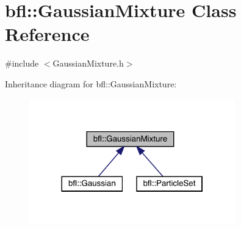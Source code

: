 \hypertarget{classbfl_1_1GaussianMixture}{}\section{bfl\+:\+:Gaussian\+Mixture Class Reference}
\label{classbfl_1_1GaussianMixture}


{\ttfamily \#include $<$Gaussian\+Mixture.\+h$>$}



Inheritance diagram for bfl\+:\+:Gaussian\+Mixture\+:
\nopagebreak
\begin{figure}[H]
\begin{center}
\leavevmode
\includegraphics[width=252pt]{classbfl_1_1GaussianMixture__inherit__graph}
\end{center}
\end{figure}
